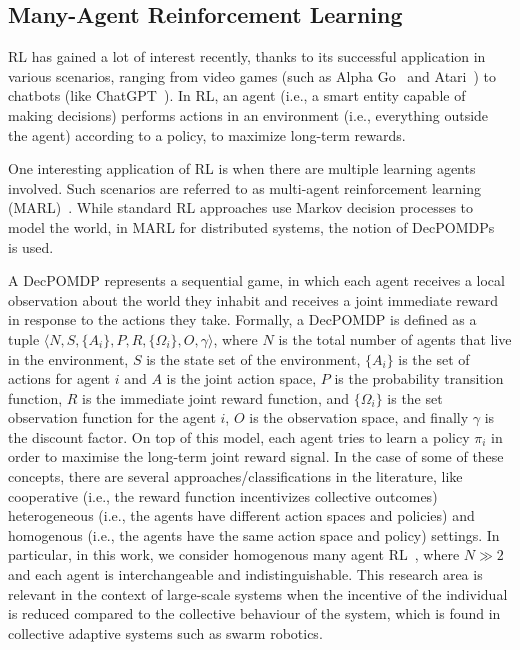 \documentclass[conference]{IEEEtran}
\begin{document}
\subsection{Many-Agent Reinforcement Learning}

\Ac{RL} has gained a lot of interest recently, 
 thanks to its successful application in various scenarios, 
 ranging from video games (such as Alpha Go~\cite{Silver2016Go} and Atari~\cite{Atari2016DQN}) 
 to chatbots (like ChatGPT~\cite{ChatGPT2023}). 
% 
In \ac{RL}, an agent (i.e., a smart entity capable of making decisions) 
 performs actions in an environment (i.e., everything outside the agent) according to a policy, 
 to maximize long-term rewards.

One interesting application of \ac{RL} is when there are multiple learning agents involved. 
 Such scenarios are referred to as multi-agent reinforcement learning (MARL)~\cite{zhang2019marl}. 
 While standard \ac{RL} approaches use Markov decision processes to model the world, 
 in MARL for distributed systems, the notion of 
 \acp{DecPOMDP}~\cite{Decpomdp2000} is used.

A \ac{DecPOMDP} represents a sequential game, 
 in which each agent receives a local observation about the world they 
 inhabit and receives a joint immediate reward in response to the actions they take. 
% 
Formally, a \ac{DecPOMDP} is defined as a tuple $\langle N, S, \{A_i\}, P, R, \{\Omega_i\}, O, \gamma \rangle$, 
 where $N$ is the total number of agents that live in the environment, 
 $S$ is the state set of the environment, 
 $\{A_i\}$ is the set of actions for agent $i$ and $A$ is the joint action space, 
 $P$ is the probability transition function, 
 $R$ is the immediate joint reward function, and 
 $\{\Omega_i\}$ is the set observation function for the agent $i$,
 $O$ is the observation space, and finally $\gamma$ is the discount factor.
%
On top of this model, each agent tries to learn a policy $\pi_i$ in order 
 to maximise the long-term joint reward signal.
In the case of some of these concepts, 
 there are several approaches/classifications in the literature, 
 like cooperative (i.e., the reward function incentivizes collective outcomes)
 heterogeneous (i.e., the agents have different action spaces and policies) and
 homogenous (i.e., the agents have the same action space and policy) settings.
%  
In particular, in this work, we consider homogenous many agent RL~\cite{yang2021many}, 
 where $N \gg 2$ and each agent is interchangeable and indistinguishable.
%
This research area is relevant in the context of large-scale systems 
 when the incentive of the individual is reduced compared to the collective behaviour of the system, 
 which is found in collective adaptive systems such as swarm robotics.
\end{document}

